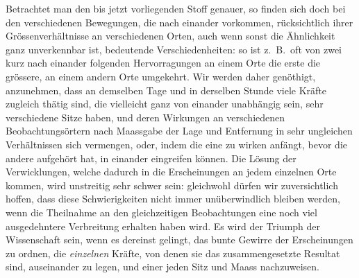 Betrachtet man den bis jetzt vorliegenden Stoff genauer, so finden sich doch bei den verschiedenen Bewegungen, die nach einander vorkommen, rücksichtlich ihrer Grössenverhältnisse an verschiedenen Orten, auch wenn sonst die Ähnlichkeit ganz unverkennbar ist, bedeutende Verschiedenheiten: so ist z.\ B.\ oft von zwei kurz nach einander folgenden Hervorragungen an einem Orte die erste die grössere, an einem andern Orte umgekehrt. Wir werden daher genöthigt, anzunehmen, dass an demselben Tage und in derselben Stunde viele Kräfte zugleich thätig sind, die vielleicht ganz von einander unabhängig sein, sehr verschiedene Sitze haben, und deren Wirkungen an verschiedenen Beobachtungsörtern nach Maassgabe der Lage und Entfernung in sehr ungleichen Verhältnissen sich vermengen, oder, indem die eine zu wirken anfängt, bevor die andere aufgehört hat, in einander eingreifen können. Die Lösung der Verwicklungen, welche dadurch in die Erscheinungen an jedem einzelnen Orte kommen, wird unstreitig sehr schwer sein: gleichwohl dürfen wir zuversichtlich hoffen, dass diese Schwierigkeiten nicht immer unüberwindlich bleiben werden, wenn die Theilnahme an den gleichzeitigen Beobachtungen eine noch viel ausgedehntere Verbreitung erhalten haben wird. Es wird der Triumph der Wissenschaft sein, wenn es dereinst gelingt, das bunte Gewirre der Erscheinungen zu ordnen, die \textit{einzelnen} Kräfte, von denen sie das zusammengesetzte Resultat sind, auseinander zu legen, und einer jeden Sitz und Maass nachzuweisen.

